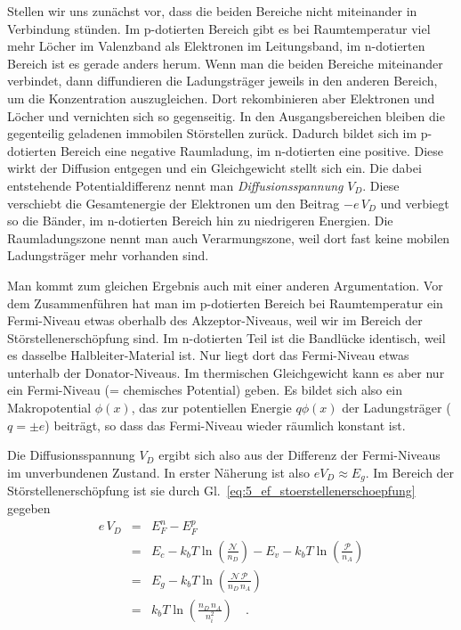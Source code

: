 Stellen wir uns zunächst vor, dass die beiden Bereiche nicht miteinander in Verbindung stünden. Im p-dotierten Bereich gibt es bei Raumtemperatur viel mehr  Löcher im Valenzband  als Elektronen im Leitungsband, im n-dotierten Bereich ist es gerade anders herum. Wenn man die beiden Bereiche miteinander verbindet, dann diffundieren die Ladungsträger jeweils in den anderen Bereich, um die Konzentration auszugleichen. Dort rekombinieren aber Elektronen und Löcher und vernichten sich so gegenseitig. In den Ausgangsbereichen bleiben die gegenteilig geladenen immobilen Störstellen zurück. Dadurch bildet sich im p-dotierten Bereich eine negative Raumladung, im n-dotierten eine positive. Diese wirkt der Diffusion entgegen und ein Gleichgewicht stellt sich ein. Die dabei entstehende Potentialdifferenz nennt man \emph{Diffusionsspannung} $V_D$. Diese verschiebt die Gesamtenergie der Elektronen um den Beitrag  $-e \, V_D$ und verbiegt so die Bänder, im n-dotierten Bereich hin zu niedrigeren Energien. Die Raumladungszone nennt man auch Verarmungszone, weil dort fast keine mobilen Ladungsträger mehr vorhanden sind. 

Man kommt zum gleichen Ergebnis auch mit einer anderen Argumentation. Vor dem Zusammenführen hat man im p-dotierten Bereich bei Raumtemperatur ein Fermi-Niveau etwas oberhalb des Akzeptor-Niveaus, weil wir im Bereich der Störstellenerschöpfung sind. Im n-dotierten Teil ist die Bandlücke identisch, weil es dasselbe Halbleiter-Material ist. Nur liegt dort das Fermi-Niveau  etwas unterhalb der Donator-Niveaus. Im thermischen Gleichgewicht kann es aber nur ein Fermi-Niveau (= chemisches Potential) geben. Es bildet sich also ein Makropotential $\phi(x)$, das zur potentiellen Energie $q \phi(x)$ der Ladungsträger ($q = \pm e$) beiträgt, so dass das Fermi-Niveau wieder räumlich konstant ist. 


Die Diffusionsspannung $V_D$ ergibt sich also aus der Differenz der Fermi-Niveaus im unverbundenen Zustand. In erster Näherung ist also $e V_D \approx E_g$. Im Bereich der Störstellenerschöpfung ist sie durch Gl.~\ref{eq:5_ef_stoerstellenerschoepfung} gegeben
\begin{eqnarray}
    e \, V_D &= & E_F^n - E_F^p \\
    & =&   E_c - k_b T \ln \left( \frac{\mathcal{N}}{n_D} \right) - 
    E_v - k_b T \ln \left( \frac{\mathcal{P}}{n_A} \right) \\
   & =& E_g -  k_b T \ln \left( \frac{\mathcal{N \, P}}{n_D \, n_A} \right) \\
   & = & k_b T \ln \left( \frac{n_D \, n_A}{n_i^2} \right)  \quad .
\end{eqnarray}

